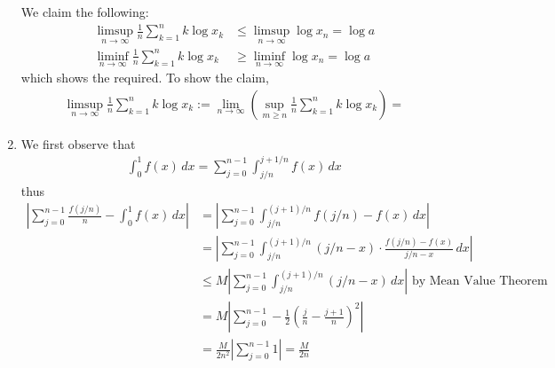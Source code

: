\documentclass[a4paper,12pt]{article}
\theoremstyle{definition}
\begin{document}
\begin{enumerate}
We claim the following:
\begin{align*}
\limsup_{n\to\infty}\frac{1}{n}\sum_{k=1}^{n}k\log x_k &\leq \limsup_{n \to \infty} \log x_n = \log a\\
\liminf_{n\to\infty}\frac{1}{n}\sum_{k=1}^{n}k\log x_k &\geq \liminf_{n \to \infty} \log x_n = \log a
\end{align*}
which shows the required. To show the claim,
\begin{align*}
\limsup_{n\to\infty}\frac{1}{n}\sum_{k=1}^{n}k\log x_k := \lim_{n\to\infty}\left(\sup_{m\geq n}\frac{1}{n}\sum_{k=1}^{n}k\log x_k\right) = 
\end{align*}


\item We first observe that 
\begin{align*}
\int_{0}^{1}f(x)\,dx = \sum_{j=0}^{n-1}\int_{j/n}^{j+1/n}f(x)\,dx
\end{align*}
thus
\begin{align*}
\left|\sum_{j=0}^{n-1}\frac{f\left(j/n\right)}{n}-\int_{0}^{1}f(x)\,dx\right|&=\left|\sum_{j=0}^{n-1}\int_{j/n}^{(j+1)/n}f\left(j/n\right)-f(x)\,dx\right|\\
&=\left|\sum_{j=0}^{n-1}\int_{j/n}^{(j+1)/n}(j/n-x)\cdot\frac{f\left(j/n\right)-f(x)}{j/n-x}\,dx\right|\\
&\leq M\left|\sum_{j=0}^{n-1}\int_{j/n}^{(j+1)/n}(j/n-x)\,dx\right| \text{ by Mean Value Theorem}\\ 
&= M \left|\sum_{j=0}^{n-1}-\frac{1}{2}\left(\frac{j}{n}-\frac{j+1}{n}\right)^2\right|\\
&=\frac{M}{2n^2}\left|\sum_{j=0}^{n-1}1\right|=\frac{M}{2n}
\end{align*}

\end{enumerate}
\end{document}
